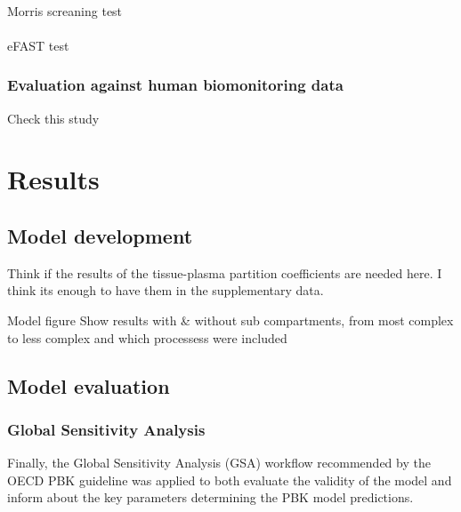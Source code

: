 \documentclass[
  authoryear,
  preprint]{elsarticle}
\makeatletter
\let\oldparagraph\paragraph
\renewcommand{\paragraph}{
    \@ifstar
      \xxxParagraphStar
      \xxxParagraphNoStar
  }
\newcommand{\xxxParagraphStar}[1]{\oldparagraph*{#1}\mbox{}}
\newcommand{\xxxParagraphNoStar}[1]{\oldparagraph{#1}\mbox{}}
\makeatother
\begin{document}
\paragraph{Morris screaning test}\label{morris-screaning-test}

\paragraph{eFAST test}\label{efast-test}

\subsubsection{Evaluation against human biomonitoring
data}\label{evaluation-against-human-biomonitoring-data}

Check this study
\citep{domingo2025, convertino2018, hanvoravongchai2024, botelho2025, lin2024, faquih2024}

\section{Results}\label{results}

\subsection{Model development}\label{model-development}

Think if the results of the tissue-plasma partition coefficients are
needed here. I think its enough to have them in the supplementary data.

Model figure Show results with \& without sub compartments, from most
complex to less complex and which processess were included

\subsection{Model evaluation}\label{model-evaluation-1}

\subsubsection{Global Sensitivity
Analysis}\label{global-sensitivity-analysis}

Finally, the Global Sensitivity Analysis (GSA) workflow recommended by
the OECD PBK guideline was applied to both evaluate the validity of the
model and inform about the key parameters determining the PBK model
predictions.
\end{document}
